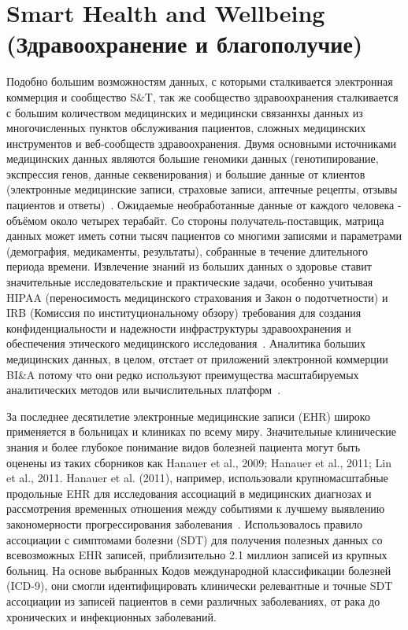 \section{Smart Health and Wellbeing (Здравоохранение и благополучие)}
Подобно большим возможностям данных, с которыми сталкивается электронная коммерция и сообщество S\&T, так же сообщество здравоохранения сталкивается с
большим количеством медицинских и медицински связаннхы данных из многочисленных пунктов обслуживания пациентов, сложных
медицинских инструментов и веб-сообществ здравоохранения.
Двумя основными источниками медицинских данных являются большие геномики данных (генотипирование, экспрессия генов, данные секвенирования) и
большие данные от клиентов (электронные медицинские записи, страховые
записи, аптечные рецепты, отзывы пациентов и
ответы)~\cite{Miller:2012a}. Ожидаемые необработанные данные
от каждого человека - объёмом около четырех терабайт. Со стороны получатель-поставщик, матрица данных может иметь сотни
тысяч пациентов со многими записями и параметрами
(демография, медикаменты, результаты), собранные в течение длительного
периода времени. Извлечение знаний из больших данных о здоровье
ставит значительные исследовательские и практические задачи, особенно
учитывая HIPAA (переносимость медицинского страхования и
Закон о подотчетности) и IRB (Комиссия по институциональному обзору)
требования для создания конфиденциальности и надежности
инфраструктуры здравоохранения и обеспечения этического медицинского
исследования~\cite{Gelfand:2012}. Аналитика больших медицинских данных,
в целом, отстает от приложений электронной коммерции BI\&A
потому что они редко используют преимущества масштабируемых аналитических
методов или вычислительных платформ~\cite{Miller:2012a}.

За последнее десятилетие электронные медицинские записи (EHR)
широко применяется в больницах и клиниках по всему миру.
Значительные клинические знания и более глубокое понимание
видов болезней пациента могут быть оценены из таких сборников как
Hanauer et al., 2009; Hanauer et al., 2011; Lin et al., 2011.
Hanauer et al. (2011), например, использовали крупномасштабные продольные
EHR для исследования ассоциаций в медицинских диагнозах
и рассмотрения временных отношения между событиями к лучшему
выявлению закономерности прогрессирования заболевания~\cite{Lin:2011}.
Использовалось правило ассоциации с симптомами болезни (SDT)
 для получения полезных данных со всевозможных EHR записей, приблизительно 2.1
миллион записей из крупных больниц. На основе выбранных
Кодов международной классификации болезней (ICD-9), они
смогли идентифицировать клинически релевантные и точные SDT
ассоциации из записей пациентов в семи различных заболеваниях,
от рака до хронических и инфекционных заболеваний.

